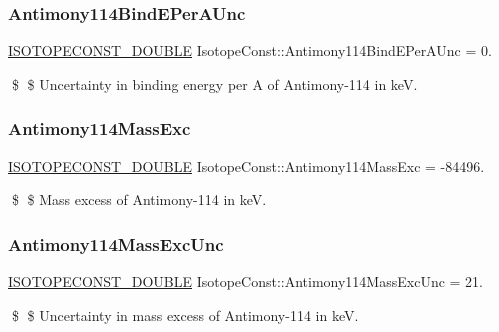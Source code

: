 \subsubsection{\texorpdfstring{Antimony114\+Bind\+E\+Per\+A\+Unc}{Antimony114BindEPerAUnc}}
{\footnotesize\ttfamily \mbox{\hyperlink{group___isotope_const-_macros_ga8f45a7272ce02c0b4c65c44636ed719a}{I\+S\+O\+T\+O\+P\+E\+C\+O\+N\+S\+T\+\_\+\+D\+O\+U\+B\+LE}} Isotope\+Const\+::\+Antimony114\+Bind\+E\+Per\+A\+Unc = 0.}

\$ \$ Uncertainty in binding energy per A of Antimony-\/114 in keV. \mbox{\label{group___isotope_const-_antimony-_sb114_ga7ad0953eb1034e0ec78a81f26be6bcb1}} 
\subsubsection{\texorpdfstring{Antimony114\+Mass\+Exc}{Antimony114MassExc}}
{\footnotesize\ttfamily \mbox{\hyperlink{group___isotope_const-_macros_ga8f45a7272ce02c0b4c65c44636ed719a}{I\+S\+O\+T\+O\+P\+E\+C\+O\+N\+S\+T\+\_\+\+D\+O\+U\+B\+LE}} Isotope\+Const\+::\+Antimony114\+Mass\+Exc = -\/84496.}

\$ \$ Mass excess of Antimony-\/114 in keV. \mbox{\label{group___isotope_const-_antimony-_sb114_ga3491ed5fcffb7e650598e82813cc6c0a}} 
\subsubsection{\texorpdfstring{Antimony114\+Mass\+Exc\+Unc}{Antimony114MassExcUnc}}
{\footnotesize\ttfamily \mbox{\hyperlink{group___isotope_const-_macros_ga8f45a7272ce02c0b4c65c44636ed719a}{I\+S\+O\+T\+O\+P\+E\+C\+O\+N\+S\+T\+\_\+\+D\+O\+U\+B\+LE}} Isotope\+Const\+::\+Antimony114\+Mass\+Exc\+Unc = 21.}

\$ \$ Uncertainty in mass excess of Antimony-\/114 in keV. \mbox{\label{group___isotope_const-_antimony-_sb114_gae12c16098d2c1bf56a537751aa3e9746}} 
